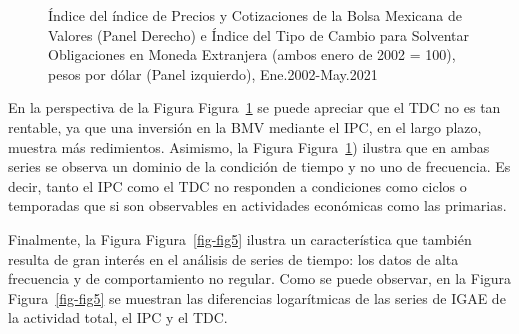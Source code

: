 \documentclass[
  a4paper,
]{article}
\begin{document}
\begin{figure}[H]

\caption{\label{fig-fig4}Índice del índice de Precios y Cotizaciones de
la Bolsa Mexicana de Valores (Panel Derecho) e Índice del Tipo de Cambio
para Solventar Obligaciones en Moneda Extranjera (ambos enero de 2002 =
100), pesos por dólar (Panel izquierdo), Ene.2002-May.2021}


\end{figure}%

En la perspectiva de la Figura Figura~\ref{fig-fig4} se puede apreciar
que el TDC no es tan rentable, ya que una inversión en la BMV mediante
el IPC, en el largo plazo, muestra más redimientos. Asimismo, la Figura
Figura~\ref{fig-fig4}) ilustra que en ambas series se observa un dominio
de la condición de tiempo y no uno de frecuencia. Es decir, tanto el IPC
como el TDC no responden a condiciones como ciclos o temporadas que si
son observables en actividades económicas como las primarias.

Finalmente, la Figura Figura~\ref{fig-fig5} ilustra un característica
que también resulta de gran interés en el análisis de series de tiempo:
los datos de alta frecuencia y de comportamiento no regular. Como se
puede observar, en la Figura Figura~\ref{fig-fig5} se muestran las
diferencias logarítmicas de las series de IGAE de la actividad total, el
IPC y el TDC.
\end{document}
